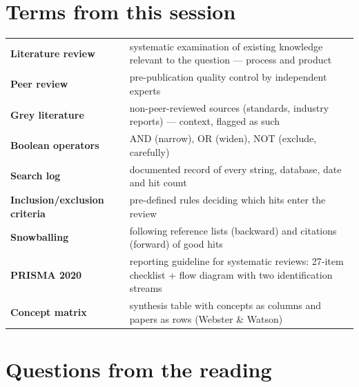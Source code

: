\documentclass[11pt,a4paper,british,twoside=false,headings=small,chapterprefix=false,numbers=noenddot]{scrbook}
\begin{document}
\section*{Terms from this session}
\begin{center}\small
\footnotesize
  \renewcommand{\arraystretch}{1.2}
  \begin{tabular}{@{}p{3.6cm}p{9.9cm}@{}}
    \toprule
    \textbf{Literature review} & systematic examination of existing knowledge relevant to the question --- process and product\\
    \textbf{Peer review} & pre-publication quality control by independent experts\\
    \textbf{Grey literature} & non-peer-reviewed sources (standards, industry reports) --- context, flagged as such\\
    \textbf{Boolean operators} & AND (narrow), OR (widen), NOT (exclude, carefully)\\
    \textbf{Search log} & documented record of every string, database, date and hit count\\
    \textbf{Inclusion/exclusion criteria} & pre-defined rules deciding which hits enter the review\\
    \textbf{Snowballing} & following reference lists (backward) and citations (forward) of good hits\\
    \textbf{PRISMA 2020} & reporting guideline for systematic reviews: 27-item checklist + flow diagram with two identification streams\\
    \textbf{Concept matrix} & synthesis table with concepts as columns and papers as rows (Webster \& Watson)\\
    \bottomrule
  \end{tabular}
\end{center}



\section*{Questions from the reading}
\end{document}
